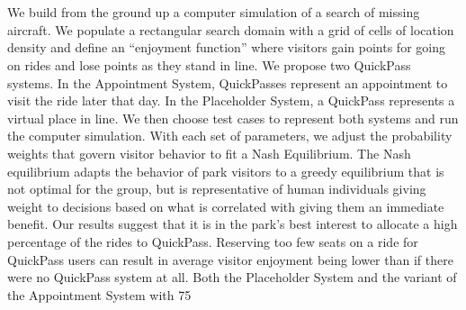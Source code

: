 \documentclass[12pt, letterpaper]{article}  %
\theoremstyle{definition}
\theoremstyle{remark}
\theoremstyle{plain}
\begin{document}
\ \vspace{0.3in} %

\begin{center}
\Large  %
\end{center}

\ \normalsize \\



We build from the ground up a computer simulation of a search of missing aircraft.  We populate a rectangular search domain with a grid of cells of location density and define an “enjoyment function” where visitors gain points for going on rides and lose points as they stand in line.  We propose two QuickPass systems.  In the Appointment System, QuickPasses represent an appointment to visit the ride later that day.  In the Placeholder System, a QuickPass represents a virtual place in line.  We then choose test cases to represent both systems and run the computer simulation.  With each set of parameters, we adjust the probability weights that govern visitor behavior to fit a Nash Equilibrium.  The Nash equilibrium adapts the behavior of park visitors to a greedy equilibrium that is not optimal for the group, but is representative of human individuals giving weight to decisions based on what is correlated with giving them an immediate benefit.  
Our results suggest that it is in the park’s best interest to allocate a high percentage of the rides to QuickPass.  Reserving too few seats on a ride for QuickPass users can result in average visitor enjoyment being lower than if there were no QuickPass system at all.  Both the Placeholder System and the variant of the Appointment System with 75%








\end{document}
